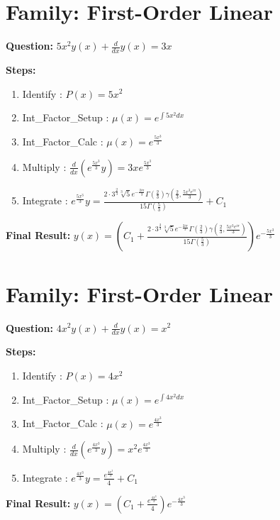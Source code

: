 \documentclass{article}
\begin{document}
\section*{Family: First-Order Linear}
\textbf{Question:} $5 x^{2} y{\left(x \right)} + \frac{d}{d x} y{\left(x \right)} = 3 x$

\textbf{Steps:}
\begin{enumerate}
\item Identify :  $P(x) = 5 x^{2}$
\item Int_Factor_Setup :  $\mu(x) = e^{\int 5 x^{2} dx}$
\item Int_Factor_Calc :  $\mu(x) = e^{\frac{5 x^{3}}{3}}$
\item Multiply :  $\frac{d}{dx}(e^{\frac{5 x^{3}}{3}}y) = 3 x e^{\frac{5 x^{3}}{3}}$
\item Integrate :  $e^{\frac{5 x^{3}}{3}}y = \frac{2 \cdot 3^{\frac{2}{3}} \sqrt[3]{5} e^{- \frac{2 i \pi}{3}} \Gamma\left(\frac{2}{3}\right) \gamma\left(\frac{2}{3}, \frac{5 x^{3} e^{i \pi}}{3}\right)}{15 \Gamma\left(\frac{5}{3}\right)} + C_1$
\end{enumerate}
\textbf{Final Result:} $y{\left(x \right)} = \left(C_{1} + \frac{2 \cdot 3^{\frac{2}{3}} \sqrt[3]{5} e^{- \frac{2 i \pi}{3}} \Gamma\left(\frac{2}{3}\right) \gamma\left(\frac{2}{3}, \frac{5 x^{3} e^{i \pi}}{3}\right)}{15 \Gamma\left(\frac{5}{3}\right)}\right) e^{- \frac{5 x^{3}}{3}}$

\section*{Family: First-Order Linear}
\textbf{Question:} $4 x^{2} y{\left(x \right)} + \frac{d}{d x} y{\left(x \right)} = x^{2}$

\textbf{Steps:}
\begin{enumerate}
\item Identify :  $P(x) = 4 x^{2}$
\item Int_Factor_Setup :  $\mu(x) = e^{\int 4 x^{2} dx}$
\item Int_Factor_Calc :  $\mu(x) = e^{\frac{4 x^{3}}{3}}$
\item Multiply :  $\frac{d}{dx}(e^{\frac{4 x^{3}}{3}}y) = x^{2} e^{\frac{4 x^{3}}{3}}$
\item Integrate :  $e^{\frac{4 x^{3}}{3}}y = \frac{e^{\frac{4 x^{3}}{3}}}{4} + C_1$
\end{enumerate}
\textbf{Final Result:} $y{\left(x \right)} = \left(C_{1} + \frac{e^{\frac{4 x^{3}}{3}}}{4}\right) e^{- \frac{4 x^{3}}{3}}$
\end{document}
